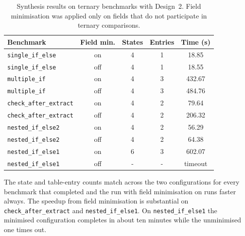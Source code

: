 \begin{table}[H]
\centering
{}
\begin{tabular}{lcccc}
\hline
\rowcolor{blue!20}
\textbf{Benchmark} & \textbf{Field min.} & \textbf{States} & \textbf{Entries} & \textbf{Time (s)} \\
\hline
\texttt{single\_if\_else}      & on  & 4 & 1 & 18.85   \\
\texttt{single\_if\_else}      & off & 4 & 1 & 18.55   \\
\texttt{multiple\_if}          & on  & 4 & 3 & 432.67  \\
\texttt{multiple\_if}          & off & 4 & 3 & 484.76  \\
\texttt{check\_after\_extract} & on  & 4 & 2 & 79.64   \\
\texttt{check\_after\_extract} & off & 4 & 2 & 206.32  \\
\texttt{nested\_if\_else2}     & on  & 4 & 2 & 56.29   \\
\texttt{nested\_if\_else2}     & off & 4 & 2 & 64.38   \\
\texttt{nested\_if\_else1}     & on  & 6 & 3 & 602.07  \\
\texttt{nested\_if\_else1}     & off & - & - & timeout \\
\hline
\end{tabular}
\caption{Synthesis results on ternary benchmarks with Design~2.
Field minimisation was applied only on fields that do not
participate in ternary comparisons.}
\label{tab:eval-ternary}
\end{table}

The state and table-entry counts match across the two
configurations for every benchmark that completed and the run with 
field minimisation on runs faster always.
The speedup from field minimisation is substantial
on \texttt{check\_after\_extract} and \texttt{nested\_if\_else1}.
On \texttt{nested\_if\_else1} the minimised configuration completes
in about ten minutes while the unminimised one times out.

